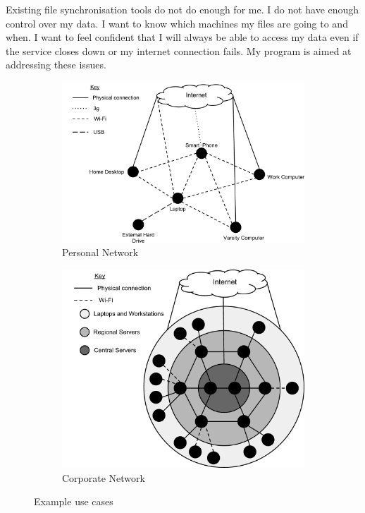 \documentclass[12pt]{article}
\begin{document}
Existing file synchronisation tools do not do enough
for me. I do not have enough control over my data.
I want to know which machines my files are going to and when.
I want to feel confident that I will always be able to access
my data even if the service closes down or my internet connection
fails. My program is aimed at addressing these issues.


\begin{figure}[htp]
    \begin{subfigure}[b]{0.5\textwidth}
        \centering
        \includegraphics[scale=0.35]{images/PersonalGraph.png}
        \caption{Personal Network}
        \label{fig:personal_graph}
    \end{subfigure}
    \begin{subfigure}[b]{0.5\textwidth}
        \includegraphics[scale=0.35]{images/CorporateGraph.png}
        \caption{Corporate Network}
        \label{fig:corp_graph}
    \end{subfigure}
    \caption{Example use cases}
\end{figure}
\end{document}
